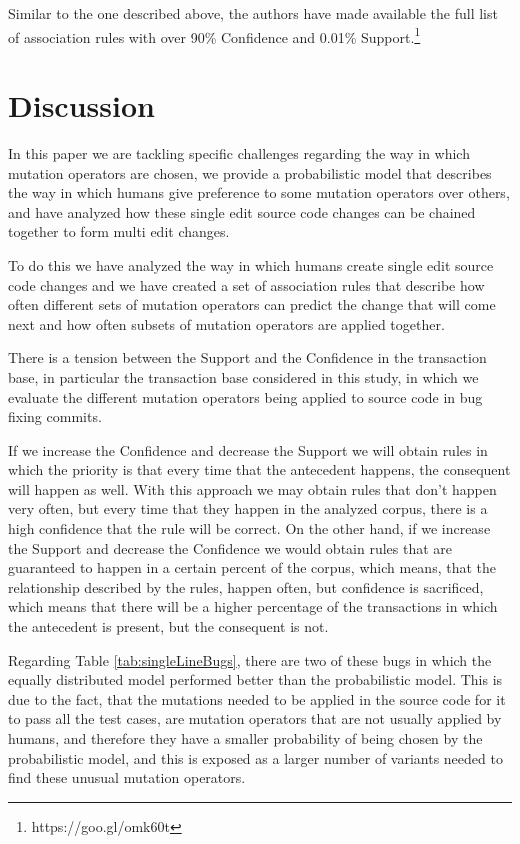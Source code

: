 \documentclass[conference]{IEEEtran}
\begin{document}
Similar to the one described above, the authors have made available the full list of association rules with over 90\% Confidence and 0.01\% Support.\footnote{https://goo.gl/omk60t}

\section{Discussion} \label{discussion}
In this paper we are tackling specific 
challenges regarding the way in which mutation operators are chosen, we provide 
a probabilistic model that describes the way in which humans give preference to 
some mutation operators over others, and have analyzed how these single edit 
source code changes can be chained together to form multi edit changes.

To do this we have analyzed the way in which humans create single edit 
source code changes and we have created a set of association rules that describe 
how often different sets of mutation operators can predict the change that will 
come next and how often subsets of mutation operators are applied together.

There is a tension between the Support and the Confidence in the transaction 
base, in particular the transaction base considered in this study, in which we 
evaluate the different mutation operators being applied to source code in bug 
fixing commits. 

If we increase the Confidence and decrease the Support we will obtain rules in 
which the priority is that every time that the antecedent happens, the 
consequent will happen as well. With this approach we may obtain rules that 
don't happen very often, but every time that they happen in the analyzed corpus, 
there is a high confidence that the rule will be correct. On the other hand, if 
we increase the Support and decrease the Confidence we would obtain rules that 
are guaranteed to happen in a certain percent of the corpus, which means, that 
the relationship described by the rules, happen often, but confidence is 
sacrificed, which means that there will be a higher percentage of the 
transactions in which the antecedent is present, but the consequent is not. 

Regarding Table \ref{tab:singleLineBugs}, there are two of these bugs in which
the equally distributed model performed better than the probabilistic
model. This is due to the fact, that the mutations needed to be applied in the
source code for it to pass all the test cases, are mutation operators that are
not usually applied by humans, and therefore they have a smaller probability of
being chosen by the probabilistic model, and this is exposed as a larger number
of variants needed to find these unusual mutation operators. 
\end{document}
